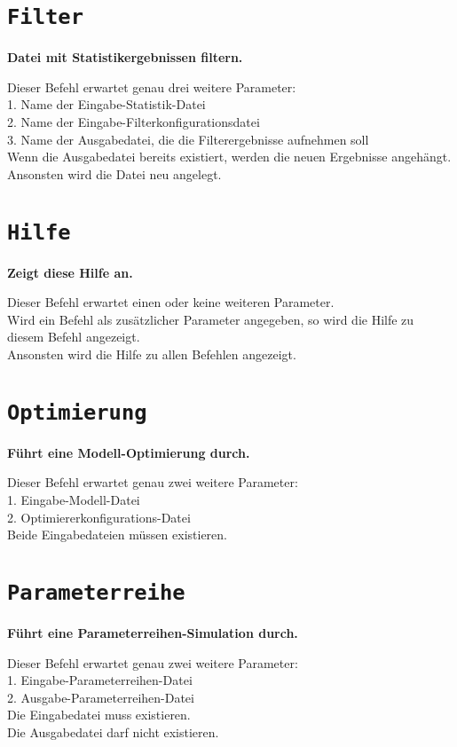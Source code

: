 \section{\texttt{Filter}}

\textbf{Datei mit Statistikergebnissen filtern.}

Dieser Befehl erwartet genau drei weitere Parameter:\\
1. Name der Eingabe-Statistik-Datei\\
2. Name der Eingabe-Filterkonfigurationsdatei\\
3. Name der Ausgabedatei, die die Filterergebnisse aufnehmen soll\\
Wenn die Ausgabedatei bereits existiert, werden die neuen Ergebnisse angehängt.\\
Ansonsten wird die Datei neu angelegt.

\section{\texttt{Hilfe}}

\textbf{Zeigt diese Hilfe an.}

Dieser Befehl erwartet einen oder keine weiteren Parameter.\\
Wird ein Befehl als zusätzlicher Parameter angegeben, so wird die Hilfe zu diesem Befehl angezeigt.\\
Ansonsten wird die Hilfe zu allen Befehlen angezeigt.

\section{\texttt{Optimierung}}

\textbf{Führt eine Modell-Optimierung durch.}

Dieser Befehl erwartet genau zwei weitere Parameter:\\
1. Eingabe-Modell-Datei\\
2. Optimiererkonfigurations-Datei\\
Beide Eingabedateien müssen existieren.

\section{\texttt{Parameterreihe}}

\textbf{Führt eine Parameterreihen-Simulation durch.}

Dieser Befehl erwartet genau zwei weitere Parameter:\\
1. Eingabe-Parameterreihen-Datei\\
2. Ausgabe-Parameterreihen-Datei\\
Die Eingabedatei muss existieren.\\
Die Ausgabedatei darf nicht existieren.

